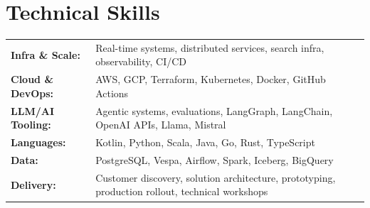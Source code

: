 \documentclass[11pt,a4paper,sans]{moderncv}
\begin{document}
\section{Technical Skills}
\begin{tabularx}{\textwidth}{lX}
\textbf{Infra \& Scale:}    & Real-time systems, distributed services, search infra, observability, CI/CD \\
\textbf{Cloud \& DevOps:} & AWS, GCP, Terraform, Kubernetes, Docker, GitHub Actions \\
\textbf{LLM/AI Tooling:} & Agentic systems, evaluations, LangGraph, LangChain, OpenAI APIs, Llama, Mistral \\
\textbf{Languages:} & Kotlin, Python, Scala, Java, Go, Rust, TypeScript \\
\textbf{Data:} & PostgreSQL, Vespa, Airflow, Spark, Iceberg, BigQuery \\
\textbf{Delivery:} & Customer discovery, solution architecture, prototyping, production rollout, technical workshops
\end{tabularx}
\end{document}
